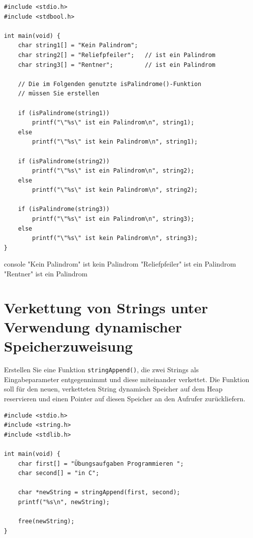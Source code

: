 \Vorlage
\begin{verbatim}
#include <stdio.h>
#include <stdbool.h>

int main(void) {
    char string1[] = "Kein Palindrom";
    char string2[] = "Reliefpfeiler";   // ist ein Palindrom
    char string3[] = "Rentner";         // ist ein Palindrom

    // Die im Folgenden genutzte isPalindrome()-Funktion
    // müssen Sie erstellen

    if (isPalindrome(string1))
        printf("\"%s\" ist ein Palindrom\n", string1);
    else
        printf("\"%s\" ist kein Palindrom\n", string1);

    if (isPalindrome(string2))
        printf("\"%s\" ist ein Palindrom\n", string2);
    else
        printf("\"%s\" ist kein Palindrom\n", string2);

    if (isPalindrome(string3))
        printf("\"%s\" ist ein Palindrom\n", string3);
    else
        printf("\"%s\" ist kein Palindrom\n", string3);
}
\end{verbatim}

\begin{mybox}[Bildschirmausgabe]{console}
"Kein Palindrom" ist kein Palindrom
"Reliefpfeiler" ist ein Palindrom
"Rentner" ist ein Palindrom
\end{mybox}




\chapter{Verkettung von Strings unter Verwendung dynamischer Speicherzuweisung}

\vspace{10pt}

Erstellen Sie eine Funktion \texttt{stringAppend()}, die zwei Strings als
Eingabeparameter entgegennimmt und diese miteinander verkettet. Die Funktion
soll für den neuen, verketteten String dynamisch Speicher auf dem Heap
reservieren und einen Pointer auf diesen Speicher an den Aufrufer zurückliefern.

\Vorlage
\begin{verbatim}
#include <stdio.h>
#include <string.h>
#include <stdlib.h>

int main(void) {
    char first[] = "Übungsaufgaben Programmieren ";
    char second[] = "in C";

    char *newString = stringAppend(first, second);
    printf("%s\n", newString);

    free(newString);
}
\end{verbatim}

